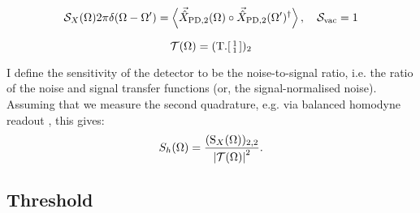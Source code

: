 
\begin{equation}
\mathcal{S}_X(\Omega)2\pi\delta(\Omega-\Omega')=\ev{\vec{\hat{X}}_{\mathrm{PD},2}(\Omega)\circ\vec{\hat{X}}_{\mathrm{PD},2}(\Omega')^\dag},\quad \mathcal{S}_\mathrm{vac}=1
\end{equation}

\begin{equation}
\mathcal{T}(\Omega)=(\mathrm{T}.\begin{bsmallmatrix}
1\\ 
1
\end{bsmallmatrix})_2
\end{equation}

I define the sensitivity of the detector to be the noise-to-signal ratio, i.e. the ratio of the noise and signal transfer functions (or, the signal-normalised noise).
Assuming that we measure the second quadrature, e.g. via balanced homodyne readout , this gives:
$$S_h(\Omega)=\frac{(\mathrm{S}_X(\Omega))_{2,2}}{\abs{\mathcal{T}(\Omega)}^2}.$$












\subsection{Threshold}

